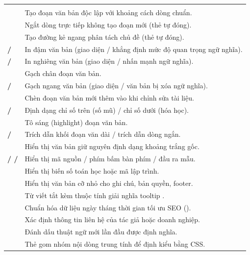 \begin{prettyTableBox}
\begin{tabularx}{\linewidth}{>{\bfseries\color{primaryBlue}}C{3.2cm} Z}
 &  \\
 & Tạo đoạn văn bản độc lập với khoảng cách dòng chuẩn. \\
 & Ngắt dòng trực tiếp không tạo đoạn mới (thẻ tự đóng). \\
 & Tạo đường kẻ ngang phân tách chủ đề (thẻ tự đóng). \\
 /  & In đậm văn bản (giao diện / khẳng định mức độ quan trọng ngữ nghĩa). \\
 /  & In nghiêng văn bản (giao diện / nhấn mạnh ngữ nghĩa). \\
 & Gạch chân đoạn văn bản. \\
 /  & Gạch ngang văn bản (giao diện / văn bản bị xóa ngữ nghĩa). \\
 & Chèn đoạn văn bản mới thêm vào khi chỉnh sửa tài liệu. \\
 /  & Định dạng chỉ số trên (số mũ) / chỉ số dưới (hóa học). \\
 & Tô sáng (highlight) đoạn văn bản. \\
 /  & Trích dẫn khối đoạn văn dài / trích dẫn dòng ngắn. \\
 & Hiển thị văn bản giữ nguyên định dạng khoảng trắng gốc. \\
 /  /  & Hiển thị mã nguồn / phím bấm bàn phím / đầu ra mẫu. \\
 & Hiển thị biến số toán học hoặc mã lập trình. \\
 & Hiển thị văn bản cỡ nhỏ cho ghi chú, bản quyền, footer. \\
 & Từ viết tắt kèm thuộc tính giải nghĩa tooltip . \\
 & Chuẩn hóa dữ liệu ngày tháng thời gian tối ưu SEO (). \\
 & Xác định thông tin liên hệ của tác giả hoặc doanh nghiệp. \\
 & Đánh dấu thuật ngữ mới lần đầu được định nghĩa. \\
 & Thẻ gom nhóm nội dòng trung tính để định kiểu bằng CSS. \\
\end{tabularx}
\end{prettyTableBox}

